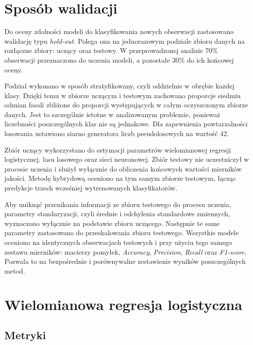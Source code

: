 \documentclass{report}
\begin{document}

\section{Sposób walidacji}

Do oceny zdolności modeli do klasyfikowania nowych obserwacji zastosowano walidację typu \textit{hold-out}. Polega ona na jednorazowym podziale zbioru danych na rozłączne zbiory: uczący oraz testowy. W przeprowadzonej analizie $70\%$ obserwacji przeznaczono do uczenia modeli, a pozostałe $30\%$ do ich końcowej oceny.

Podział wykonano w sposób stratyfikowany, czyli oddzielnie w obrębie każdej klasy. Dzięki temu w zbiorze uczącym i testowym zachowano proporcje siedmiu odmian fasoli zbliżone do proporcji występujących w całym oczyszczonym zbiorze danych. Jest to szczególnie istotne w analizowanym problemie, ponieważ liczebności poszczególnych klas nie są jednakowe. Dla zapewnienia powtarzalności losowania ustawiono ziarno generatora liczb pseudolosowych na wartość 42.

Zbiór uczący wykorzystano do estymacji parametrów wielomianowej regresji logistycznej, lasu losowego oraz sieci neuronowej. Zbiór testowy nie uczestniczył w procesie uczenia i służył wyłącznie do obliczenia końcowych wartości mierników jakości. Metodę hybrydową oceniono na tym samym zbiorze testowym, łącząc predykcje trzech wcześniej wytrenowanych klasyfikatorów.

Aby uniknąć przenikania informacji ze zbioru testowego do procesu uczenia, parametry standaryzacji, czyli średnie i odchylenia standardowe zmiennych, wyznaczono wyłącznie na podstawie zbioru uczącego. Następnie te same parametry zastosowano do przeskalowania zbioru testowego. Wszystkie modele oceniono na identycznych obserwacjach testowych i przy użyciu tego samego zestawu mierników: macierzy pomyłek, \textit{Accuracy}, \textit{Precision}, \textit{Recall} oraz \textit{F1-score}. Pozwala to na bezpośrednie i porównywalne zestawienie wyników poszczególnych metod.


\section{Wielomianowa regresja logistyczna}

\subsection*{Metryki}
\end{document}
